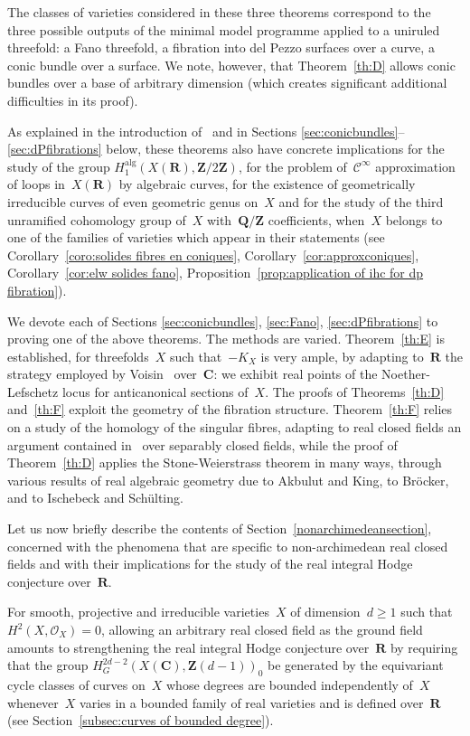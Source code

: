 \documentclass[JEP,XML,SOM,Unicode]{cedram}
\theoremstyle{plain}
\theoremstyle{definition}
\numberwithin{equation}{section}
\newcommand{\alg}{{\mathrm{alg}}}
\newcommand{\sO}{{\mathscr O}}
\renewcommand{\C}{{\mathbf C}}
\newcommand{\Q}{{\mathbf Q}}
\newcommand{\R}{{\mathbf R}}
\newcommand{\Z}{{\mathbf Z}}
\newcommand{\ci}{\mathscr{C}^{\infty}}
\begin{document}
{The classes of varieties considered in these three theorems correspond to the
three possible outputs of the minimal model programme applied to a uniruled
threefold: a Fano threefold, a fibration into del Pezzo surfaces over
a curve, a conic bundle over a surface.
We note, however, that Theorem~\ref{th:D} allows conic bundles over a base of
arbitrary dimension (which creates significant additional difficulties
in its proof).

As explained in the introduction of~\cite{BW1} and in
Sections \ref{sec:conicbundles}--\ref{sec:dPfibrations}
below, these theorems also have concrete implications for the study of the
group $H_1^\alg(X(\R),\Z/2\Z)$, for the
problem of~$\ci$ approximation of loops in~$X(\R)$ by algebraic
curves, for the existence of geometrically irreducible curves of
even geometric genus on~$X$ and for the study of the third unramified cohomology group
of~$X$ with~$\Q/\Z$ coefficients,
when~$X$ belongs to one of the families of varieties which appear in their statements (see
Corollary~\ref{coro:solides fibres en coniques},
Corollary~\ref{cor:approxconiques},
Corollary~\ref{cor:elw solides fano},
Proposition~\ref{prop:application of ihc for dp fibration}).

We devote each of
Sections \ref{sec:conicbundles}, \ref{sec:Fano}, \ref{sec:dPfibrations}
to proving one of the above theorems.
The methods are varied.
Theorem~\ref{th:E} is established, for threefolds~$X$ such that~$-K_X$ is very ample,
by adapting to~$\R$
the strategy employed by Voisin~\cite{voisinthreefolds} over~$\C$:
we exhibit real points of the Noether-Lefschetz locus for anticanonical sections of~$X$.
The proofs of Theorems~\ref{th:D} and~\ref{th:F} exploit the geometry of the fibration structure.
Theorem~\ref{th:F} relies on a study of the homology of the singular
fibres, adapting to real closed fields an argument contained in~\cite{ewzcl} over separably
closed fields,
while the proof of Theorem~\ref{th:D}
applies the Stone-Weierstrass theorem in many ways,
through
various results of real algebraic geometry due to Akbulut and King, to Bröcker,
and to Ischebeck and Schülting.

Let us now briefly describe the contents of Section~\ref{nonarchimedeansection},
concerned with the phenomena that are specific to
non-archimedean real closed fields and with their implications for the study of
the real integral Hodge conjecture over~$\R$.

For smooth, projective and irreducible varieties~$X$ of dimension~$d\geq 1$
such that $H^2(X,\sO_X)=0$,
allowing an arbitrary real closed field as the ground field amounts to strengthening
the real integral Hodge conjecture over~$\R$ by requiring that the group
$H^{2d-2}_G(X(\C),\Z(d-1))_0$ be generated by the equivariant cycle classes of
curves on~$X$ whose degrees
are bounded independently of~$X$ whenever~$X$ varies in a bounded family of
real varieties and is defined over~$\R$ (see Section~\ref{subsec:curves of bounded degree}).

}
\end{document}
